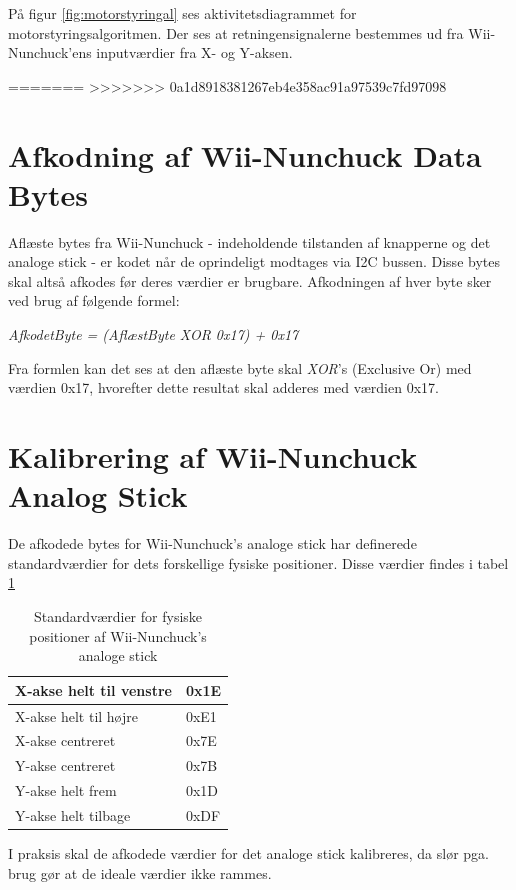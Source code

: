 \noindent På figur \ref{fig:motorstyringal} ses aktivitetsdiagrammet for motorstyringsalgoritmen. Der ses at retningensignalerne bestemmes ud fra Wii-Nunchuck'ens inputværdier fra X- og Y-aksen.

=======
>>>>>>> 0a1d8918381267eb4e358ac91a97539c7fd97098
\section{Afkodning af Wii-Nunchuck Data Bytes}
Aflæste bytes fra Wii-Nunchuck - indeholdende tilstanden af knapperne og det analoge stick - er kodet når de oprindeligt modtages via I2C bussen. Disse bytes skal altså afkodes før deres værdier er brugbare. Afkodningen af hver byte sker ved brug af følgende formel:

\textit{AfkodetByte = (AflæstByte XOR 0x17) + 0x17}

Fra formlen kan det ses at den aflæste byte skal \textit{XOR}'s (Exclusive Or) med værdien 0x17, hvorefter dette resultat skal adderes med værdien 0x17.

\section{Kalibrering af Wii-Nunchuck Analog Stick}
De afkodede bytes for Wii-Nunchuck's analoge stick har definerede standardværdier for dets forskellige fysiske positioner. Disse værdier findes i tabel \ref{tabel:WiiNunchuckStickPositioner}

\begin{table}[H]
	\centering
	\begin{tabular}{|l|l|}
		\hline
		X-akse helt til venstre & 0x1E \\ \hline
		X-akse helt til højre   & 0xE1 \\ \hline
		X-akse centreret        & 0x7E \\ \hline
		Y-akse centreret        & 0x7B \\ \hline
		Y-akse helt frem        & 0x1D \\ \hline
		Y-akse helt tilbage     & 0xDF \\ \hline
	\end{tabular}
	\caption{Standardværdier for fysiske positioner af Wii-Nunchuck's analoge stick}
	\label{tabel:WiiNunchuckStickPositioner}
\end{table}

I praksis skal de afkodede værdier for det analoge stick kalibreres, da slør pga. brug gør at de ideale værdier ikke rammes. 

